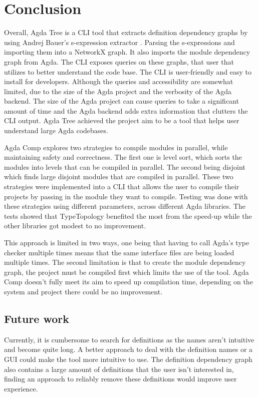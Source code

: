 
\chapter{Conclusion}

Overall, Agda Tree is a CLI tool that extracts definition dependency graphs by
using Andrej Bauer's s-expression extractor \cite{andrej}. Parsing the
s-expressions and importing them into a NetworkX graph. It also imports the
module dependency graph from Agda. The CLI exposes queries on these graphs,
that user that utilizes to better understand the code base. The CLI is
user-friendly and easy to install for developers. Although the queries and
accessibility are somewhat limited, due to the size of the Agda project and the
verbosity of the Agda backend. The size of the Agda project can cause queries
to take a significant amount of time and the Agda backend adds extra
information that clutters the CLI output. Agda Tree achieved the project aim to
be a tool that helps user understand large Agda codebases.

Agda Comp explores two strategies to compile modules in parallel, while
maintaining safety and correctness. The first one is level sort, which sorts
the modules into levels that can be compiled in parallel. The second being
disjoint which finds large disjoint modules that are compiled in parallel.
These two strategies were implemented into a CLI that allows the user to
compile their projects by passing in the module they want to compile. Testing
was done with these strategies using different parameters, across different
Agda libraries. The tests showed that TypeTopology benefited the most from the
speed-up while the other libraries got modest to no improvement.

This approach is limited in two ways, one being that having to call Agda's type
checker multiple times means that the same interface files are being loaded
multiple times. The second limitation is that to create the module dependency
graph, the project must be compiled first which limits the use of the tool.
Agda Comp doesn't fully meet its aim to speed up compilation time, depending on
the system and project there could be no improvement.

\section{Future work}

Currently, it is cumbersome to search for definitions as the names aren't
intuitive and become quite long. A better approach to deal with the definition
names or a GUI could make the tool more intuitive to use. The definition
dependency graph also contains a large amount of definitions that the user
isn't interested in, finding an approach to reliably remove these definitions
would improve user experience.

